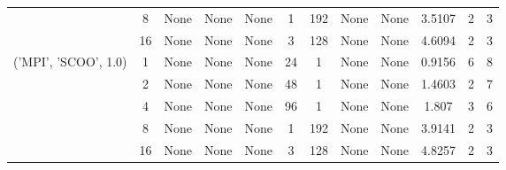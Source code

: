 \begin{tabular}{cccccccccccc}
& 8& None& None& None& 1& 192& None& None& 3.5107& 2& 3\\
& 16& None& None& None& 3& 128& None& None& 4.6094& 2& 3\\
\hline
\multirow{5}{*}{('MPI', 'SCOO', 1.0)}& 1& None& None& None& 24& 1& None& None& 0.9156& 6& 8\\
& 2& None& None& None& 48& 1& None& None& 1.4603& 2& 7\\
& 4& None& None& None& 96& 1& None& None& 1.807& 3& 6\\
& 8& None& None& None& 1& 192& None& None& 3.9141& 2& 3\\
& 16& None& None& None& 3& 128& None& None& 4.8257& 2& 3\\
\hline
\end{tabular}
